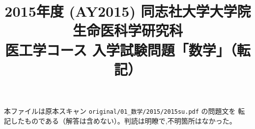 \documentclass[11pt,a4paper]{article}
\title{2015年度 (AY2015) 同志社大学大学院 生命医科学研究科\\
医工学コース 入学試験問題「数学」（転記）}
\author{}
\date{}
\begin{document}
\maketitle
\vspace{-3em}

\begin{rem}
本ファイルは原本スキャン \texttt{original/01\_数学/2015/2015su.pdf} の問題文を
転記したものである（解答は含めない）。判読は明瞭で,不明箇所はなかった。
\end{rem}

\bigskip

\bigskip

\bigskip

\bigskip

\bigskip

\bigskip

\bigskip

\end{document}
